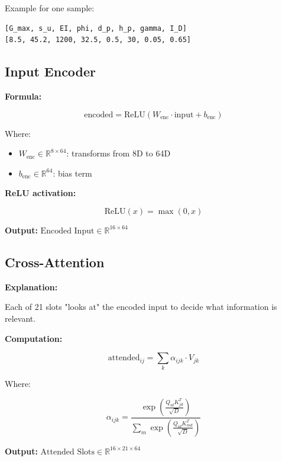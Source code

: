 \documentclass[11pt,a4paper]{article}
\begin{document}
Example for one sample:
\begin{lstlisting}
[G_max, s_u, EI, phi, d_p, h_p, gamma, I_D]
[8.5, 45.2, 1200, 32.5, 0.5, 30, 0.05, 0.65]
\end{lstlisting}

\subsection{Input Encoder}

\textbf{Formula:}

\begin{equation}
\text{encoded} = \text{ReLU}(W_{\text{enc}} \cdot \text{input} + b_{\text{enc}})
\end{equation}

Where:
\begin{itemize}
  \item $W_{\text{enc}} \in \mathbb{R}^{8 \times 64}$: transforms from 8D to 64D
  \item $b_{\text{enc}} \in \mathbb{R}^{64}$: bias term
\end{itemize}

\textbf{ReLU activation:}

\begin{equation}
\text{ReLU}(x) = \max(0, x)
\end{equation}

\textbf{Output:} $\text{Encoded Input} \in \mathbb{R}^{16 \times 64}$

\subsection{Cross-Attention}

\textbf{Explanation:}

Each of 21 slots "looks at" the encoded input to decide what information is relevant.

\textbf{Computation:}

\begin{equation}
\text{attended}_{ij} = \sum_k \alpha_{ijk} \cdot V_{jk}
\end{equation}

Where:

\begin{equation}
\alpha_{ijk} = \frac{\exp\left(\frac{Q_{id} K_{jd}^T}{\sqrt{D}}\right)}{\sum_m \exp\left(\frac{Q_{id} K_{md}^T}{\sqrt{D}}\right)}
\end{equation}

\textbf{Output:} $\text{Attended Slots} \in \mathbb{R}^{16 \times 21 \times 64}$
\end{document}
